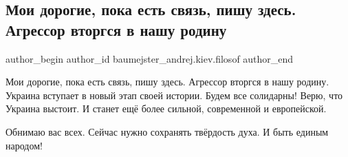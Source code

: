  
 
 
 
 
 
\subsection{Мои дорогие, пока есть связь, пишу здесь. Агрессор вторгся в нашу родину}
\label{sec:24_02_2022.fb.baumejster_andrej.kiev.filosof.1.agressor_rodina}
 
\ifcmt
 author_begin
   author_id baumejster_andrej.kiev.filosof
 author_end
\fi

Мои дорогие, пока есть связь, пишу здесь. Агрессор вторгся в нашу родину.
Украина вступает в новый этап своей истории. Будем все солидарны! Верю, что
Украина выстоит. И станет ещё более сильной, современной и европейской.

Обнимаю вас всех. Сейчас нужно сохранять твёрдость духа. И быть единым народом!
